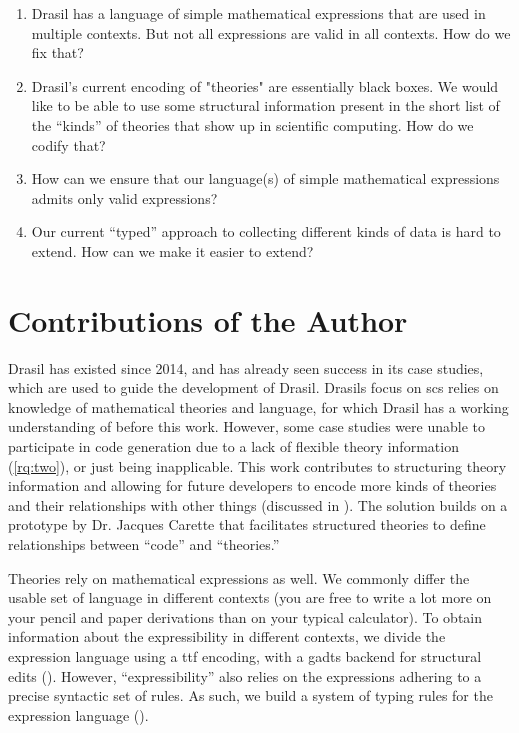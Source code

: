 \begin{enumerate}

      \item[\namedlabel{rq:one}{RQ1}] Drasil has a language of simple
            mathematical expressions that are used in multiple contexts. But not
            all expressions are valid in all contexts. How do we fix that?

      \item[\namedlabel{rq:two}{RQ2}] Drasil's current encoding of "theories"
            are essentially black boxes. We would like to be able to use some
            structural information present in the short list of the ``kinds'' of
            theories that show up in scientific computing. How do we codify
            that?

      \item[\namedlabel{rq:three}{RQ3}] How can we ensure that our language(s)
            of simple mathematical expressions admits only valid expressions?

      \item[\namedlabel{rq:four}{RQ4}] Our current ``typed'' approach to
            collecting different kinds of data is hard to extend. How can we
            make it easier to extend?

\end{enumerate}

\section{Contributions of the Author}
\label{sec:intro:contributions}

Drasil has existed since 2014, and has already seen success in its case studies,
which are used to guide the development of Drasil. Drasils focus on \acs{scs}
relies on knowledge of mathematical theories and language, for which Drasil has
a working understanding of before this work. However, some case studies were
unable to participate in code generation due to a lack of flexible theory
information (\ref{rq:two}), or just being inapplicable. This work contributes to
structuring theory information and allowing for future developers to encode more
kinds of theories and their relationships with other things (discussed in
). The solution builds on a prototype by Dr. Jacques
Carette that facilitates
structured theories to define relationships between ``code'' and ``theories.''

Theories rely on mathematical expressions as well. We commonly differ the usable
set of language in different contexts (you are free to write a lot more on your
pencil and paper derivations than on your typical calculator). To obtain
information about the expressibility in different contexts, we divide the
expression language using a \acs{ttf} \cite{Carette2009} encoding, with a
\acsp{gadt} backend for structural edits (). However,
``expressibility'' also relies on the expressions adhering to a precise
syntactic set of rules. As such, we build a system of typing rules for the
expression language ().

